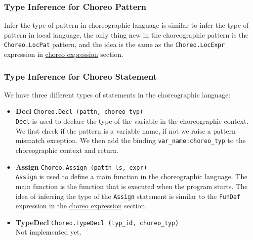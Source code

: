\documentclass{article}
\begin{document}
    \subsubsection{Type Inference for Choreo Pattern}\label{choreo_pattern}
        Infer the type of pattern in choreographic language is similar to infer the type of pattern in local language,
        the only thing new in the choreographic pattern is the \texttt{Choreo.LocPat} pattern,
        and the idea is the same as the \texttt{Choreo.LocExpr} expression in \hyperref[choreo_expr]{choreo expression} section.

    \subsubsection{Type Inference for Choreo Statement}\label{choreo_stmt}
        We have three different types of statements in the choreographic language:
        \begin{itemize}
            \item \textbf{Decl} \texttt{Choreo.Decl (pattn, choreo\_typ)}\\
                  \texttt{Decl} is used to declare the type of the variable in the choreographic context.
                  We first check if the pattern is a variable name, if not we raise a pattern mismatch exception.
                  We then add the binding \texttt{var\_name:choreo\_typ} to the choreographic context and return.
            \item \textbf{Assign} \texttt{Choreo.Assign (pattn\_ls, expr)}\\
                  \texttt{Assign} is used to define a main function in the choreographic language. The main function is the function that is executed when the program starts. 
                  The idea of inferring the type of the \texttt{Assign} statement is similar to the \texttt{FunDef} expression in the \hyperref[choreo_expr]{choreo expression} section. 
            \item \textbf{TypeDecl} \texttt{Choreo.TypeDecl (typ\_id, choreo\_typ)}\\
                  Not implemented yet.
        \end{itemize}

        \newpage %
\end{document}
